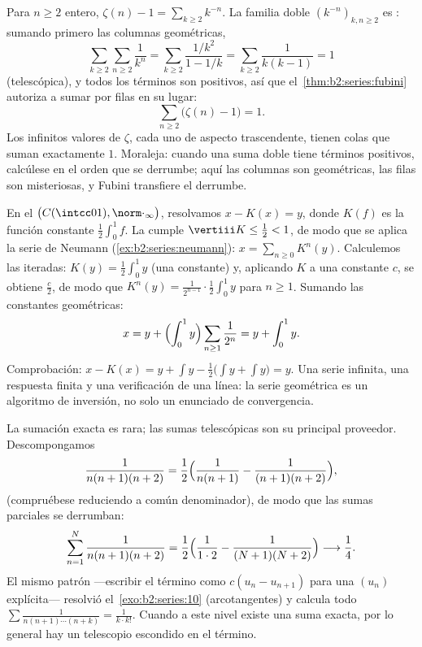 \begin{example}[Una evaluación por Fubini: $\sum_n (\zeta(n) - 1) = 1$]\label{ex:b2:series:zetasum}
Para $n \geq 2$ entero, $\zeta(n) - 1 = \sum_{k \geq 2} k^{-n}$. La
familia doble $(k^{-n})_{k, n \geq 2}$ es : sumando primero
las columnas geométricas,
\[
\sum_{k\geq2}\sum_{n\geq2} \frac{1}{k^n}
= \sum_{k\geq2} \frac{1/k^2}{1 - 1/k}
= \sum_{k\geq2} \frac{1}{k(k-1)} = 1
\]
(telescópica), y todos los términos son positivos, así que el~\cref{thm:b2:series:fubini} autoriza a sumar por filas en su lugar:
\[
\sum_{n\geq2}\bigl(\zeta(n) - 1\bigr) = 1 .
\]
Los infinitos valores de $\zeta$, cada uno de aspecto
trascendente, tienen colas que suman exactamente $1$. Moraleja:
cuando una suma doble tiene términos positivos, calcúlese en el
orden que se derrumbe; aquí las columnas son geométricas, las filas
son misteriosas, y Fubini transfiere el derrumbe.
\end{example}

\begin{example}\label{ex:b2:series:neumannsolve}
En el  $\bigl(C(\intcc01),
\norm\cdot_\infty\bigr)$, resolvamos $x - K(x) = y$, donde $K(f)$
es la función constante $\frac12\int_0^1 f$. La 
cumple $\vertiii K \leq \frac12 < 1$, de modo que se aplica la
serie de Neumann (\cref{ex:b2:series:neumann}): $x = \sum_{n\geq0}
K^n(y)$. Calculemos las iteradas: $K(y) = \frac12\int_0^1 y$ (una
constante) y, aplicando $K$ a una constante $c$, se obtiene $\frac
c2$, de modo que $K^n(y) = \frac{1}{2^{n-1}}\cdot\frac12\int_0^1 y$
para $n \geq 1$. Sumando las constantes geométricas:
\[
x = y + \Bigl(\int_0^1 y\Bigr)
\sum_{n\geq1}\frac{1}{2^n} = y + \int_0^1 y .
\]
Comprobación: $x - K(x) = y + \int y - \frac12\bigl(\int y + \int
y\bigr) = y$. Una serie infinita, una respuesta finita y una
verificación de una línea: la serie geométrica es un algoritmo de
inversión, no solo un enunciado de convergencia.
\end{example}

\begin{example}\label{ex:b2:series:telescope}
La sumación exacta es rara; las sumas telescópicas son su principal
proveedor. Descompongamos
\[
\frac{1}{n(n+1)(n+2)}
= \frac{1}{2}\Bigl(\frac{1}{n(n+1)} -
\frac{1}{(n+1)(n+2)}\Bigr),
\]
(compruébese reduciendo a común denominador), de modo que las sumas
parciales se derrumban:
\[
\sum_{n=1}^{N}\frac{1}{n(n+1)(n+2)}
= \frac12\Bigl(\frac{1}{1\cdot2} -
\frac{1}{(N+1)(N+2)}\Bigr)
\longrightarrow \frac14 .
\]
El mismo patrón ---escribir el término como $c(u_n - u_{n+1})$ para
una $(u_n)$ explícita--- resolvió el~\cref{exo:b2:series:10}
(arcotangentes) y calcula todo $\sum\frac{1}{n(n+1)\cdots(n + k)} =
\frac{1}{k\cdot k!}$. Cuando a este nivel existe una suma exacta,
por lo general hay un telescopio escondido en el término.
\end{example}

